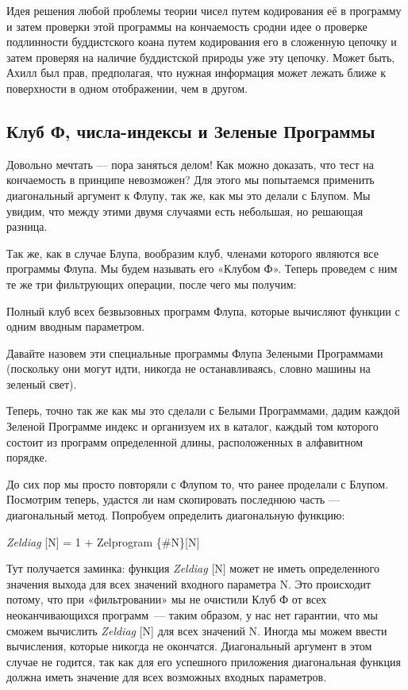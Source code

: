 \documentclass[../main.tex]{subfiles}
\begin{document}
Идея решения любой проблемы теории чисел путем кодирования её в программу и затем проверки этой программы на кончаемость сродни идее о проверке подлинности буддистского коана путем кодирования его в сложенную цепочку и затем проверяя на наличие буддистской природы уже эту цепочку. Может быть, Ахилл был прав, предполагая, что нужная информация может лежать ближе к поверхности в одном отображении, чем в другом.


\subsection{Клуб Ф, числа-индексы и Зеленые Программы}

Довольно мечтать --- пора заняться делом! Как можно доказать, что тест на кончаемость в принципе невозможен? Для этого мы попытаемся применить диагональный аргумент к Флупу, так же, как мы это делали с Блупом. Мы увидим, что между этими двумя случаями есть небольшая, но решающая разница.

Так же, как в случае Блупа, вообразим клуб, членами которого являются все программы Флупа. Мы будем называть его «Клубом Ф». Теперь проведем с ним те же три фильтрующих операции, после чего мы получим:

Полный клуб всех безвызовных программ Флупа, которые вычисляют функции с одним вводным параметром.

Давайте назовем эти специальные программы Флупа Зелеными Программами (поскольку они могут идти, никогда не останавливаясь, словно машины на зеленый свет).

Теперь, точно так же как мы это сделали с Белыми Программами, дадим каждой Зеленой Программе индекс и организуем их в каталог, каждый том которого состоит из программ определенной длины, расположенных в алфавитном порядке.

До сих пор мы просто повторяли с Флупом то, что ранее проделали с Блупом. Посмотрим теперь, удастся ли нам скопировать последнюю часть --- диагональный метод. Попробуем определить диагональную функцию:

\emph{Zeldiag} {[}N{]} = 1 + Zelprogram \{\#N\}{[}N{]}

Тут получается заминка: функция \emph{Zeldiag} {[}N{]} может не иметь определенного значения выхода для всех значений входного параметра N\@. Это происходит потому, что при «фильтровании» мы не очистили Клуб Ф от всех неоканчивающихся программ~--- таким образом, у нас нет гарантии, что мы сможем вычислить \emph{Zeldiag} {[}N{]} для всех значений N\@. Иногда мы можем ввести вычисления, которые никогда не окончатся. Диагональный аргумент в этом случае не годится, так как для его успешного приложения диагональная функция должна иметь значение для всех возможных входных параметров.
\end{document}
